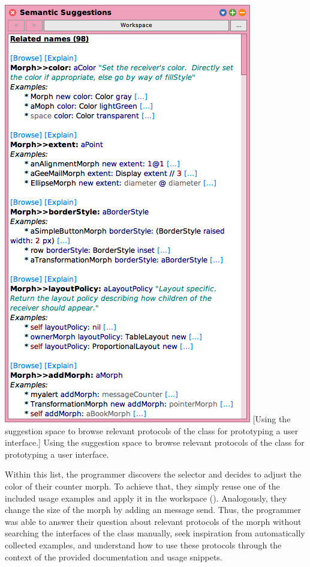 \addvspace{\parskip}
\noindent
\begin{minipage}{\textwidth}
	\centering
	\includegraphics[height=28\baselineskip]{01_suggestions/suggestion_space.png} %
	[Using the suggestion space to browse relevant protocols of the class  for prototyping a user interface.]{
		Using the suggestion space to browse relevant protocols of the class  for prototyping a user interface.
	}
\end{minipage}

Within this list, the programmer discovers the  selector and decides to adjust the color of their counter morph.
To achieve that, they simply reuse one of the included usage examples and apply it in the workspace ().
Analogously, they change the size of the morph by adding an  message send.
Thus, the programmer was able to answer their question about relevant protocols of the morph without searching the interfaces of the  class manually, seek inspiration from automatically collected examples, and understand how to use these protocols through the context of the provided documentation and usage snippets.

